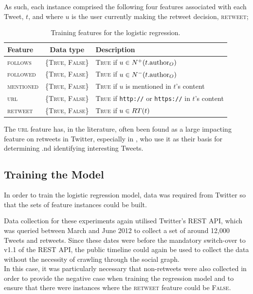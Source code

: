 As such, each instance comprised the following four features associated with each Tweet, $t$, and where $u$ is the user currently making the retweet decision, \textsc{retweet};

\begin{table}[h]\footnotesize
\begin{center}
\begin{tabular}{ l | c | l }
	Feature & Data type & Description\\
	\hline
	\hline 
	\textsc{follows}    & \{\textsc{True, False}\} & \textsc{True} if $u \in N^+(t.\textrm{author}_O)$\\
    \textsc{followed}   & \{\textsc{True, False}\} & \textsc{True} if $u \in N^-(t.\textrm{author}_O)$\\
    \textsc{mentioned}  & \{\textsc{True, False}\} & \textsc{True} if $u$ is mentioned in $t$'s content\\
    \textsc{url}        & \{\textsc{True, False}\} & \textsc{True} if \texttt{http://} or \texttt{https://} in $t$'s content\\
    \hline 
    \textsc{retweet}    & \{\textsc{True, False}\} & \textsc{True} if $u \in RT(t)$\\ 
    \hline
\end{tabular}
\end{center}
\caption{Training features for the logistic regression.}
\label{table:logisticregressionfeatures}
\end{table}

The \textsc{url} feature has, in the literature, often been found as a large impacting feature on retweets in Twitter, especially in \cite{alonso10}, who use it as their basis for determining .nd identifying interesting Tweets.


\subsection{Training the Model}
In order to train the logistic regression model, data was required from Twitter so that the sets of feature instances could be built. 

Data collection for these experiments again utilised Twitter's REST API, which was queried between March and June 2012 to collect a set of around 12,000 Tweets and retweets. Since these dates were before the mandatory switch-over to v1.1 of the REST API, the public timeline could again be used to collect the data without the necessity of crawling through the social graph.\\
In this case, it was particularly necessary that non-retweets were also collected in order to provide the negative case when training the regression model and to ensure that there were instances where the \textsc{retweet} feature could be \textsc{False}.

